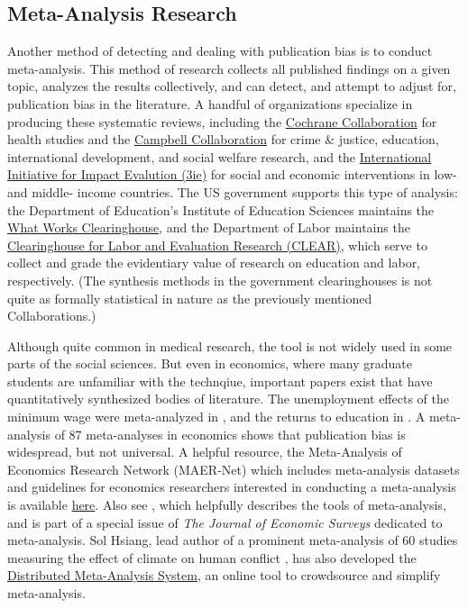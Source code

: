 \documentclass[12pt] {article}
\begin{document}
\subsection{Meta-Analysis Research}
Another method of detecting and dealing with publication bias is to conduct meta-analysis. This method of research collects all published findings on a given topic, analyzes the results collectively, and can detect, and attempt to adjust for, publication bias in the literature. A handful of organizations specialize in producing these systematic reviews, including the \href{http://www.cochrane.org}{Cochrane Collaboration} for health studies and the \href{http://www.campbellcollaboration.org/}{Campbell Collaboration} for crime \& justice, education, international development, and social welfare research, and the \href{http://www.3ie.org}{International Initiative for Impact Evalution (3ie)} for social and economic interventions in low- and middle- income countries. The US government supports this type of analysis: the Department of Education's Institute of Education Sciences maintains the \href{http://ies.ed.gov/ncee/wwc/}{What Works Clearinghouse}, and the Department of Labor maintains the \href{http://clear.dol.gov/}{Clearinghouse for Labor and Evaluation Research (CLEAR)}, which serve to collect and grade the evidentiary value of research on education and labor, respectively. (The synthesis methods in the government clearinghouses is not quite as formally statistical in nature as the previously mentioned Collaborations.)

Although quite common in medical research, the tool is not widely used in some parts of the social sciences. But even in economics, where many graduate students are unfamiliar with the technqiue, important papers exist that have quantitatively synthesized bodies of literature. The unemployment effects of the minimum wage were meta-analyzed in \cite{card1995time}, and the returns to education in \cite{ashenfelter1999review}. A meta-analysis of 87 meta-analyses in economics shows that publication bias is widespread, but not universal. A helpful resource, the Meta-Analysis of Economics Research Network (MAER-Net) which includes meta-analysis datasets and guidelines for economics researchers interested in conducting a meta-analysis is available \href{https://www.hendrix.edu/maer-network/}{here}. Also see \cite{stanley2005beyond}, which helpfully describes the tools of meta-analysis, and is part of a special issue of \textit{The Journal of Economic Surveys} dedicated to meta-analysis. Sol Hsiang, lead author of a prominent meta-analysis of 60 studies measuring the effect of climate on human conflict \citep{hsiang2013climate}, has also developed the \href{http://dmas.berkeley.edu}{Distributed Meta-Analysis System}, an online tool to crowdsource and simplify meta-analysis.
\end{document}
